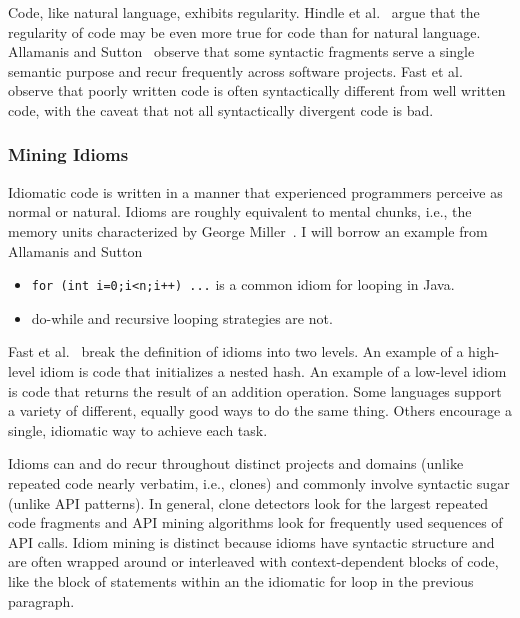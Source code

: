 
Code, like natural language, exhibits regularity. Hindle et al.~\cite{Hindle2012} argue that the regularity of code may be even more true for code than for natural language. Allamanis and Sutton~\cite{allamanis2014mining} observe that some syntactic fragments serve a single semantic purpose and recur frequently across software projects. Fast et al.~\cite{codex} observe that poorly written code is often syntactically different from well written code, with the caveat that not all syntactically divergent code is bad.

\subsubsection{Mining Idioms}

Idiomatic code is written in a manner that experienced programmers perceive as normal or natural. Idioms are roughly equivalent to mental chunks, i.e., the memory units characterized by George Miller~\cite{chunking}. I will borrow an example from Allamanis and Sutton~\cite{allamanis2014mining}

\begin{itemize}
\item \texttt{for (int i=0;i<n;i++) ...} is a common idiom for looping in Java.
\item do-while and recursive looping strategies are not.
\end{itemize}


Fast et al.~\cite{codex} break the definition of idioms into two levels. An example of a high-level idiom is code that initializes a nested hash. An example of a low-level idiom is code that returns the result of an addition operation. Some languages support a variety of different, equally good ways to do the same thing. Others encourage a single, idiomatic way to achieve each task.

Idioms can and do recur throughout distinct projects and domains (unlike repeated code nearly verbatim, i.e., clones) and commonly involve syntactic sugar (unlike API patterns). In general, clone detectors look for the largest repeated code fragments and API mining algorithms look for frequently used sequences of API calls. Idiom mining is distinct because idioms have syntactic structure and are often wrapped around or interleaved with context-dependent blocks of code, like the block of statements within an the idiomatic for loop in the previous paragraph.

